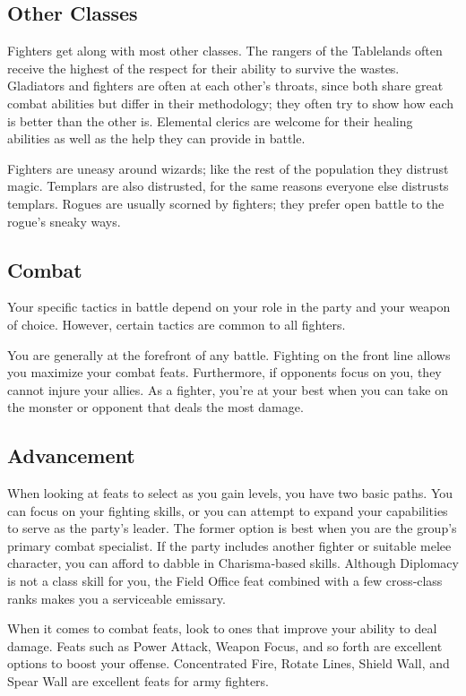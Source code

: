 \subsection{Other Classes}

Fighters get along with most other classes. The rangers of the Tablelands often receive the highest of the respect for their ability to survive the wastes. Gladiators and fighters are often at each other’s throats, since both share great combat abilities but differ in their methodology; they often try to show how each is better than the other is. Elemental clerics are welcome for their healing abilities as well as the help they can provide in battle.

Fighters are uneasy around wizards; like the rest of the population they distrust magic. Templars are also distrusted, for the same reasons everyone else distrusts templars. Rogues are usually scorned by fighters; they prefer open battle to the rogue’s sneaky ways.

\subsection{Combat}

Your specific tactics in battle depend on your role in the party and your weapon of choice. However, certain tactics are common to all fighters.

You are generally at the forefront of any battle. Fighting on the front line allows you maximize your combat feats. Furthermore, if opponents focus on you, they cannot injure your allies. As a fighter, you’re at your best when you can take on the monster or opponent that deals the most damage.

\subsection{Advancement}

When looking at feats to select as you gain levels, you have two basic paths. You can focus on your fighting skills, or you can attempt to expand your capabilities to serve as the party’s leader. The former option is best when you are the group’s primary combat specialist. If the party includes another fighter or suitable melee character, you can afford to dabble in Charisma‐based skills. Although Diplomacy is not a class skill for you, the Field Office feat combined with a few cross‐class ranks makes you a serviceable emissary.

When it comes to combat feats, look to ones that improve your ability to deal damage. Feats such as Power Attack, Weapon Focus, and so forth are excellent options to boost your offense. Concentrated Fire, Rotate Lines, Shield Wall, and Spear Wall are excellent feats for army fighters.

